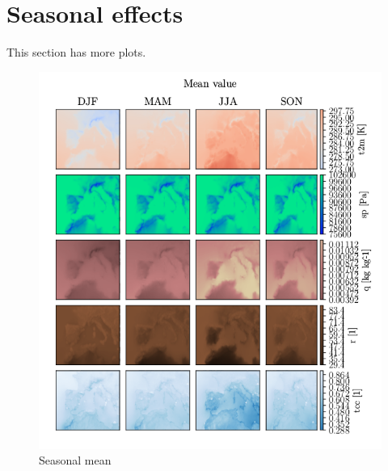 \chapter{Seasonal effects}
This section has more plots. 
\begin{figure}[ht]
    \centering
    \includegraphics{python_figs/seasonal_mean_all_variables.png}
    \caption{Seasonal mean}
    \label{fig:seasonal_mean}
\end{figure}


